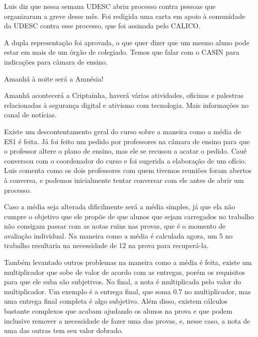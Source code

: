 \documentclass{ata-calico}
\begin{document}
\maketitle

\itemize
\item Luis diz que nessa semana UDESC abriu processo contra pessoas que organizaram a greve desse mês. Foi redigida uma carta em apoio à comunidade da UDESC contra esse processo, que foi assinada pelo CALICO.

\item A dupla representação foi aprovada, o que quer dizer que um mesmo aluno pode estar em mais de um órgão de colegiado. Temos que falar com o CASIN para indicações para câmara de ensino.

\item Amanhã à noite será a Amnésia!

\item Amanhã acontecerá a Criptainha, haverá várias atividades, oficinas e palestras relacionadas à segurança digital e ativismo com tecnologia. Mais informações no canal de notícias.

Existe um descontentamento geral do curso sobre a maneira como a média de ES1 é feita. Já foi feito um pedido por professores na câmara de ensino para que o professor altere o plano de ensino, mas ele se recusou a acatar o pedido. Cauê conversou com o coordenador do curso e foi sugerida a elaboração de um ofício. Luis comenta como os dois professores com quem tivemos reuniões foram abertos à conversa, e podemos inicialmente tentar conversar com ele antes de abrir um processo.

Caso a média seja alterada dificilmente será a média simples, já que ela não cumpre o objetivo que ele propõe de que alunos que sejam carregados no trabalho não consigam passar com as notas ruins nas provas, que é o momento de avaliação individual. Na maneira como a média é calculada agora, um 5 no trabalho resultaria na necessidade de 12 na prova para recuperá-la.

Também levantado outros problemas na maneira como a média é feita, existe um multiplicador que sobe de valor de acordo com as entregas, porém os requisitos para que ele suba são subjetivos. No final, a nota é multiplicada pelo valor do multiplicador. Um exemplo é a entrega final, que soma 0.7 no multiplicador, mas uma entrega final completa é algo subjetivo. Além disso, existem cálculos bastante complexos que acabam ajudando os alunos na prova e que podem inclusive remover a necessidade de fazer uma das provas, e, nesse caso, a nota de uma das outras tem seu valor dobrado.
\end{document}

